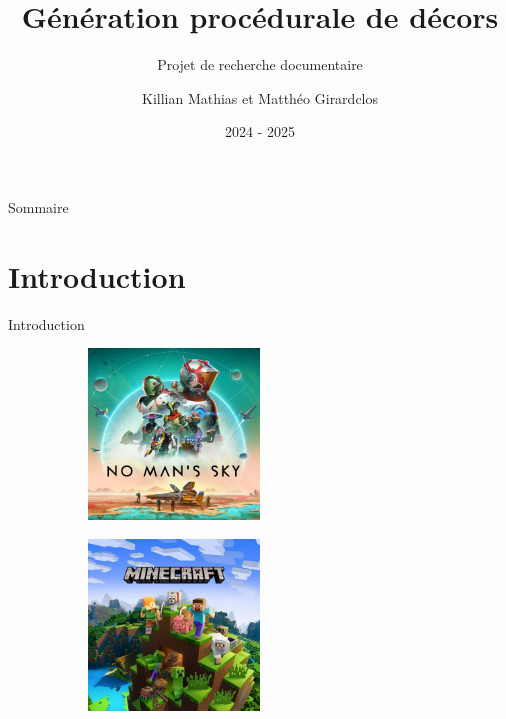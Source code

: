 \documentclass[aspectratio=169]{beamer}
\title[Génération procédurale]{Génération procédurale de décors}
\subtitle{Projet de recherche documentaire}
\author[K.Mathias, M.Girardclos]{Killian Mathias et Matthéo Girardclos}
\institute[UMLP]{Université Marie et Louis Pasteur}
\date{2024 - 2025}
\begin{document}
\begin{frame}
    \titlepage
\end{frame}

\begin{frame}[t]{Sommaire}
    \tableofcontents[hideallsubsections]
\end{frame}


\section{Introduction}

\begin{frame}{Introduction}
    \lipsum[1][1-5]
    \vfill
    \begin{figure}[!h]
        \centering
        \begin{subfigure}[b]{0.3\textwidth}
            \centering
            \includegraphics[width=0.5\textwidth]{assets/nomanssky.png}
        \end{subfigure}
        \hspace{-1cm}
        \begin{subfigure}[b]{0.3\textwidth}
            \centering
            \includegraphics[width=0.5\textwidth]{assets/minecraft.png}
        \end{subfigure}
    \end{figure}
\end{frame}
\end{document}
